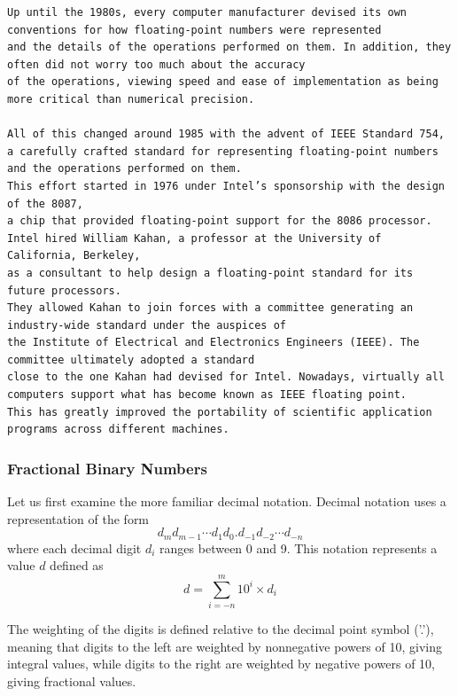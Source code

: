 \documentclass[11pt]{article}
\begin{document}
\begin{verbatim}
Up until the 1980s, every computer manufacturer devised its own conventions for how floating-point numbers were represented 
and the details of the operations performed on them. In addition, they often did not worry too much about the accuracy
of the operations, viewing speed and ease of implementation as being more critical than numerical precision.

All of this changed around 1985 with the advent of IEEE Standard 754, 
a carefully crafted standard for representing floating-point numbers and the operations performed on them. 
This effort started in 1976 under Intel’s sponsorship with the design of the 8087, 
a chip that provided floating-point support for the 8086 processor. 
Intel hired William Kahan, a professor at the University of California, Berkeley, 
as a consultant to help design a floating-point standard for its future processors. 
They allowed Kahan to join forces with a committee generating an industry-wide standard under the auspices of 
the Institute of Electrical and Electronics Engineers (IEEE). The committee ultimately adopted a standard 
close to the one Kahan had devised for Intel. Nowadays, virtually all computers support what has become known as IEEE floating point. 
This has greatly improved the portability of scientific application programs across different machines.
\end{verbatim}


\subsubsection{Fractional Binary Numbers}
\label{sec:orgc15568d}

Let us first examine the more familiar decimal notation. Decimal notation uses a representation of the form\\
\begin{equation}
d_m d_{m-1} \cdots d_1 d_0 . d_{-1} d_{-2} \cdots d_{-n}
\end{equation}
where each decimal digit \(d_i\) ranges between 0 and 9. This notation represents a value \(d\) defined as\\
\begin{equation}
d = \sum_{i=-n}^m 10^i \times d_i
\end{equation}

The weighting of the digits is defined relative to the decimal point symbol ('.'), meaning that digits to the left are weighted by nonnegative powers of 10, giving integral values, while digits to the right are weighted by negative powers of 10, giving fractional values.\\
\end{document}
